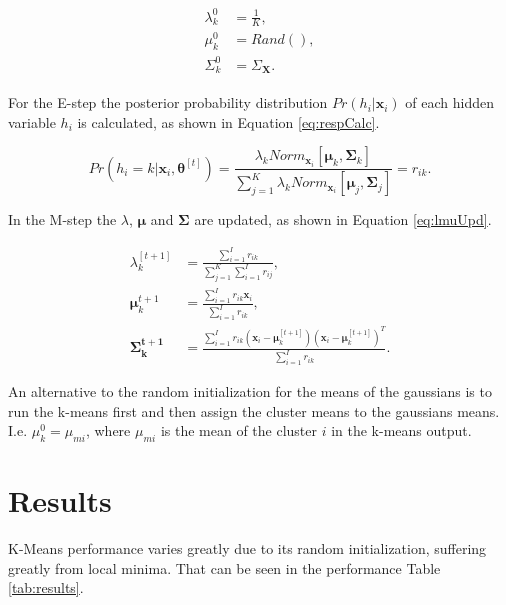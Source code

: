 \documentclass[12pt]{article}
\begin{document}
\begin{align}
\begin{split}
\label{eq:mixInit}
\lambda_k^0 &= \frac{1}{K},\\
\mu_k^0 &= Rand(),\\
\Sigma_k^0 &= \Sigma_{\mathbf{X}}.
\end{split}
\end{align}

For the E-step the posterior probability distribution $Pr(h_i|\mathbf{x}_i)$ of each hidden variable $h_i$ is calculated, as shown in Equation \ref{eq:respCalc}.

\begin{equation}
\label{eq:respCalc}
Pr(h_i = k|\mathbf{x}_i, \boldsymbol{\theta}^{[t]}) = \frac{\lambda_k Norm_{\mathbf{x}_i} \left[ \boldsymbol{\mu}_k, \mathbf{\Sigma}_k \right] } { \sum_{j=1}^K \lambda_k Norm_{\mathbf{x}_i} \left[ \boldsymbol{\mu}_j, \mathbf{\Sigma}_j \right] } = r_{ik}.
\end{equation}

In the M-step the $\lambda$, $\boldsymbol\mu$ and $\mathbf{\Sigma}$ are updated, as shown in Equation \ref{eq:lmuUpd}.

\begin{equation}
\begin{split}
\label{eq:lmuUpd}
\lambda_k^{[t+1]} &= \frac{\sum_{i=1}^I r_{ik}} {\sum_{j=1}^K \sum_{i=1}^I r_{ij}},\\
\boldsymbol \mu_k^{t+1} &= \frac{\sum_{i=1}^I r_{ik} \mathbf{x}_i}{\sum_{i=1}^Ir_{ik}},\\
\mathbf{\Sigma_k^{t+1}} &= \frac{\sum_{i=1}^I r_{ik} ( \mathbf{x}_i - \boldsymbol{\mu}_k^{[t+1]} ) ( \mathbf{x}_i - \boldsymbol{\mu}_k^{[t+1]} )^T } {\sum_{i=1}^Ir_{ik}}.
\end{split}
\end{equation}

An alternative to the random initialization for the means of the gaussians is to run the k-means first and then assign the cluster means to the gaussians means.
I.e. $\mu^0_k = \mu_{mi}$, where $\mu_{mi}$ is the mean of the cluster $i$ in the k-means output. 

\section{Results}

K-Means performance varies greatly due to its random initialization, suffering greatly from local minima.
That can be seen in the performance Table \ref{tab:results}.
\end{document}
